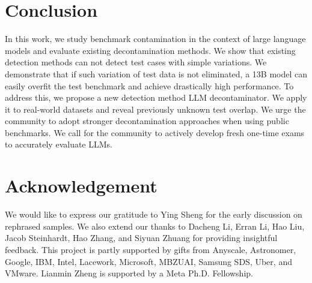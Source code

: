 \section{Conclusion}
\label{sec:conclusion}
In this work, we study benchmark contamination in the context of large language models and evaluate existing decontamination methods.
We show that existing detection methods can not detect test cases with simple variations. 
We demonstrate that if such variation of test data is not eliminated, a 13B model can easily overfit the test benchmark and achieve drastically high performance.
To address this, we propose a new detection method LLM decontaminator. We apply it to real-world datasets and reveal previously unknown test overlap.
We urge the community to adopt stronger decontamination approaches when using public benchmarks. We call for the community to actively develop fresh one-time exams to accurately evaluate LLMs.

\section*{Acknowledgement}
We would like to express our gratitude to Ying Sheng for the early discussion on rephrased samples.
We also extend our thanks to Dacheng Li, Erran Li, Hao Liu, Jacob Steinhardt, Hao Zhang, and Siyuan Zhuang for providing insightful feedback.
This project is partly supported by gifts from Anyscale, Astronomer, Google, IBM, Intel, Lacework, Microsoft, MBZUAI, Samsung SDS, Uber, and VMware. Lianmin Zheng is supported by a Meta Ph.D. Fellowship.








